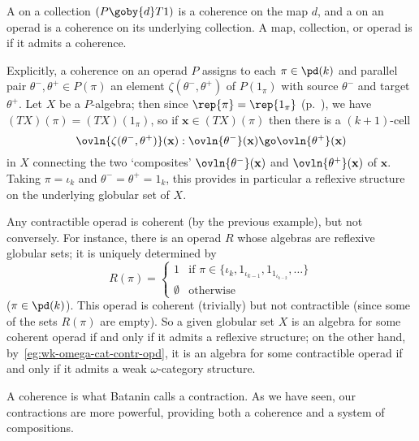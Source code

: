 \begin{defn}	
A %
%
%
on a collection $(P \goby{d} T1)$ is a coherence on the
map $d$, and a %
%
%
on an operad is a coherence on its
underlying collection.  A map, collection, or operad is %
%
%
%
%
if
it admits a coherence.  
\end{defn}
%
Explicitly, a coherence on an operad $P$ assigns to each $\pi\in\pd(k)$ and
parallel pair $\theta^-, \theta^+ \in P(\pi)$ an element $\zeta(\theta^-,
\theta^+)$ of $P(1_\pi)$ with source $\theta^-$ and target $\theta^+$.  Let
$X$ be a $P$-algebra; then since $\rep{\pi} = \rep{1_\pi}$
(p.~\pageref{p:degen-rep}), we have $(TX)(\pi) = (TX)(1_\pi)$, so if
$\mathbf{x} \in (TX)(\pi)$ then there is a $(k+1)$-cell
\[
\ovln{\zeta(\theta^-, \theta^+)} (\mathbf{x}):
\ovln{\theta^-}(\mathbf{x})
\go 
\ovln{\theta^+}(\mathbf{x})
\]
in $X$ connecting the two `composites' $\ovln{\theta^-}(\mathbf{x})$ and
$\ovln{\theta^+}(\mathbf{x})$ of $\mathbf{x}$.  Taking $\pi = \iota_k$ and
$\theta^- = \theta^+ = 1_k$, this provides in particular a reflexive
structure on the underlying globular set of $X$.
%
\begin{example}	
Any contractible operad is coherent (by the previous example), but not
conversely.  For instance, there is an operad $R$ whose algebras are
reflexive globular sets; it is uniquely determined by
\[
R(\pi) =
\left\{
\begin{array}{ll}
1		&
\textrm{if } \pi \in 
\{ \iota_k, 1_{\iota_{k-1}}, 1_{1_{\iota_{k-2}}}, \ldots \}
\\
\emptyset	&\textrm{otherwise}
\end{array}
\right.
\]
($\pi\in\pd(k)$).  This operad is coherent (trivially) but not contractible
(since some of the sets $R(\pi)$ are empty).  So a given globular set $X$
is an algebra for some coherent operad if and only if it admits a reflexive
structure; on the other hand, by~\ref{eg:wk-omega-cat-contr-opd}, it is an
algebra for some contractible operad if and only if it admits a weak
$\omega$-category structure.
\end{example}

%
%
%
A coherence is what Batanin%
%
%
calls a contraction.  As we have seen, our
contractions are more powerful, providing both a coherence and a system of
compositions.  

